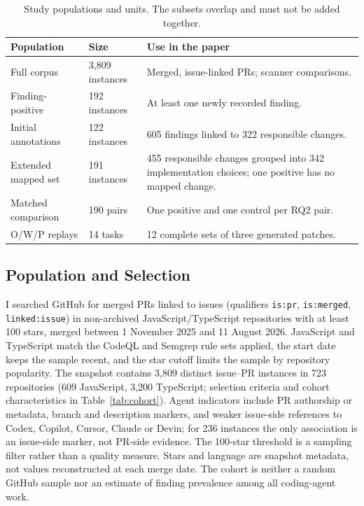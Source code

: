 \documentclass[acmsmall,screen,nonacm]{acmart}
\begin{document}
\begin{table}[H]
\caption{Study populations and units. The subsets overlap and must not be added together.}
\label{tab:population-guide}
\footnotesize\renewcommand{\arraystretch}{1.10}
\begin{tabularx}{\linewidth}{@{}L{2.65cm}L{2.2cm}Y@{}}
\toprule
\textbf{Population} & \textbf{Size} & \textbf{Use in the paper}\\
\midrule
Full corpus & 3,809 instances & Merged, issue-linked PRs; scanner comparisons.\\
Finding-positive & 192 instances & At least one newly recorded finding.\\
Initial annotations & 122 instances & 605 findings linked to 322 responsible changes.\\
Extended mapped set & 191 instances & 455 responsible changes grouped into 342 implementation choices; one positive has no mapped change.\\
Matched comparison & 190 pairs & One positive and one control per RQ2 pair.\\
O/W/P replays & 14 tasks & 12 complete sets of three generated patches.\\
\bottomrule
\end{tabularx}
\end{table}



\subsection{Population and Selection}

I searched GitHub for merged PRs linked to issues (qualifiers \texttt{is:pr}, \texttt{is:merged}, \texttt{linked:issue}) in non-archived JavaScript/\allowbreak TypeScript repositories with at least 100 stars, merged between 1 November 2025 and 11 August 2026. JavaScript and TypeScript match the CodeQL and Semgrep rule sets applied, the start date keeps the sample recent, and the star cutoff limits the sample by repository popularity. The snapshot contains 3,809 distinct issue--PR instances in 723 repositories (609 JavaScript, 3,200 TypeScript; selection criteria and cohort characteristics in Table~\ref{tab:cohort}). Agent indicators include PR authorship or metadata, branch and description markers, and weaker issue-side references to Codex, Copilot, Cursor, Claude or Devin; for 236 instances the only association is an issue-side marker, not PR-side evidence. The 100-star threshold is a sampling filter rather than a quality measure. Stars and language are snapshot metadata, not values reconstructed at each merge date. The cohort is neither a random GitHub sample nor an estimate of finding prevalence among all coding-agent work.
\end{document}
